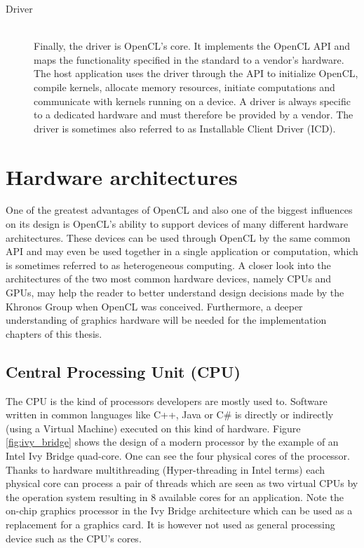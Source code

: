 \begin{description}
	\item[Driver] \hfill \\
	Finally, the driver is OpenCL's core. It implements the OpenCL API and maps the functionality specified in the standard to a vendor's hardware. The host application uses the driver through the API to initialize OpenCL, compile kernels, allocate memory resources, initiate computations and communicate with kernels running on a device. A driver is always specific to a dedicated hardware and must therefore be provided by a vendor. The driver is sometimes also referred to as Installable Client Driver (ICD).
\end{description}

\section{Hardware architectures}
\label{sec:hardware_arch}

One of the greatest advantages of OpenCL and also one of the biggest influences on its design is OpenCL's ability to support devices of many different hardware architectures. These devices can be used through OpenCL by the same common API and may even be used together in a single application or computation, which is sometimes referred to as heterogeneous computing.
A closer look into the architectures of the two most common hardware devices, namely CPUs and GPUs, may help the reader to better understand design decisions made by the Khronos Group when OpenCL was conceived. Furthermore, a deeper understanding of graphics hardware will be needed for the implementation chapters of this thesis.

\subsection{Central Processing Unit (CPU)}

The CPU is the kind of processors developers are mostly used to. Software written in common languages like C++, Java or C\# is directly or indirectly (using a Virtual Machine) executed on this kind of hardware.
Figure \ref{fig:ivy_bridge} shows the design of a modern processor by the example of an Intel Ivy Bridge quad-core. One can see the four physical cores of the processor. Thanks to hardware multithreading (Hyper-threading in Intel terms) each physical core can process a pair of threads which are seen as two virtual CPUs by the operation system resulting in 8 available cores for an application.
Note the on-chip graphics processor in the Ivy Bridge architecture which can be used as a replacement for a graphics card. It is however not used as general processing device such as the CPU's cores.

